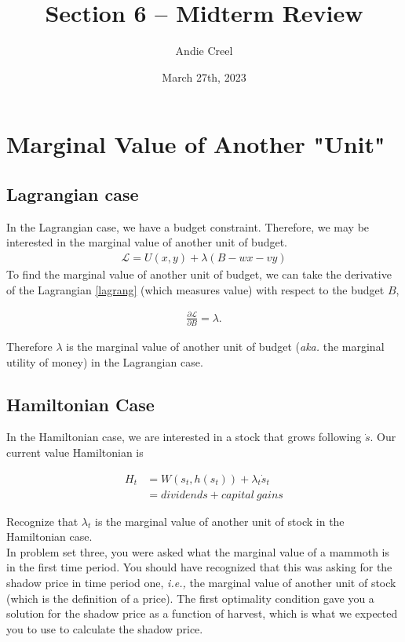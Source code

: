 \documentclass[12pt]{article}
\title{Section 6 -- Midterm Review}
\author{Andie Creel}
\date{March 27th, 2023}
\begin{document}
\maketitle

\section{Marginal Value of Another "Unit"}

\subsection{Lagrangian case}
In the Lagrangian case, we have a budget constraint. Therefore, we may be interested in the marginal value of another unit of budget. 
\begin{align}
    \mathcal{L} = U(x,y) + \lambda(B - wx - vy) \label{lagrang}
\end{align}
To find the marginal value of another unit of budget, we can take the derivative of the Lagrangian \ref{lagrang} (which measures value) with respect to the budget $B$,

\begin{align}
    \frac{\partial \mathcal{L}}{\partial B} = \lambda.
\end{align}

Therefore $\lambda$ is the marginal value of another unit of budget (\textit{aka.} the marginal utility of money) in the Lagrangian case. 

\subsection{Hamiltonian Case}
In the Hamiltonian case, we are interested in a stock that grows following $\dot s$. Our current value Hamiltonian is

\begin{align}
    H_t &= W(s_t, h(s_t)) + \lambda_t \dot s_t \label{hamil}\\ 
    &= dividends + capital \ gains
\end{align}


Recognize that $\lambda_t$ is the marginal value of another unit of stock in the Hamiltonian case. \\

In problem set three, you were asked what the marginal value of a mammoth is in the first time period. You should have recognized that this was asking for the shadow price in time period one, \textit{i.e.,} the marginal value of another unit of stock (which is the definition of a price). The first optimality condition gave you a solution for the shadow price as a function of harvest, which is what we expected you to use to calculate the shadow price.\\
\end{document}
